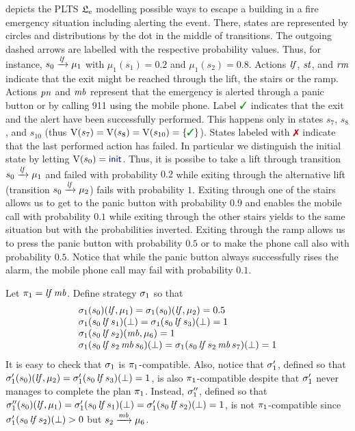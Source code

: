 \begin{example}[Running]\label{ex:running}
   depicts the PLTS $\mathfrak{L}_{\mathrm{e}}$ modelling
  possible ways to escape a building in a fire emergency situation
  including alerting the event.  There, states are represented by
  circles and distributions by the dot in the middle of transitions.
  The outgoing dashed arrows are labelled with the respective
  probability values.  Thus, for instance, $s_0\xrightarrow{\mathit{lf}}\mu_1$
  with $\mu_1(s_1)=0.2$ and $\mu_1(s_2)=0.8$.
  Actions $\mathit{lf}$, $\mathit{st}$, and $\mathit{rm}$ indicate that the exit might
  be reached through the lift, the stairs or the ramp.  Actions
  $\mathit{pn}$ and $\mathit{mb}$ represent that the emergency is alerted
  through a panic button or by calling 911 using the mobile phone.
  Label $\goal$ indicates that the exit and the alert have been
  successfully performed.  This happens only in states $s_7$, $s_8$,
  and $s_{10}$ (thus $\V(s_7)=\V(s_8)=\V(s_{10})=\{\goal\}$).  States
  labeled with $\fail$ indicate that the last performed action has
  failed.  In particular we distinguish the initial state by letting
  $\V(s_0)=\init$.
  Thus, it is possibe to take a lift through transition
  $s_0\xrightarrow{\mathit{lf}}\mu_1$ and failed with probability $0.2$ while
  exiting through the alternative lift (transition
  $s_0\xrightarrow{\mathit{lf}}\mu_2$) fails with probability $1$.
  Exiting through one of the stairs allows us to get to the panic
  button with probability $0.9$ and enables the mobile call with
  probability $0.1$ while exiting through the other stairs yields to
  the same situation but with the probabilities inverted.  Exiting
  through the ramp allows us to press the panic button with
  probability $0.5$ or to make the phone call also with probability
  $0.5$.
  Notice that while the panic button always successfully rises the
  alarm, the mobile phone call may fail with probability $0.1$.

  Let $\pi_1 = \mathit{lf}\,\mathit{mb}$.  Define strategy $\sigma_1$ so that
  \[
  \begin{array}{l}
    \sigma_1(s_0)(\mathit{lf},\mu_1)=\sigma_1(s_0)(\mathit{lf},\mu_2)=0.5\\
    \sigma_1(s_0\,\mathit{lf}\,s_1)(\bot)=\sigma_1(s_0\,\mathit{lf}\,s_3)(\bot)=1\\
    \sigma_1(s_0\,\mathit{lf}\,s_2)(\mathit{mb},\mu_6)=1\\
    \sigma_1(s_0\,\mathit{lf}\,s_2\,\mathit{mb}\,s_6)(\bot)=
    \sigma_1(s_0\,\mathit{lf}\,s_2\,\mathit{mb}\,s_7)(\bot)=1
  \end{array}
  \]
  It is easy to check that $\sigma_1$ is $\pi_1$-compatible.
  Also, notice that $\sigma'_1$, defined so that
  $\sigma'_1(s_0)(\mathit{lf},\mu_2)=\sigma'_1(s_0\,\mathit{lf}\,s_3)(\bot)=1$,
  is also $\pi_1$-compatible despite that $\sigma'_1$ never manages to
  complete the plan $\pi_1$.
  Instead, $\sigma''_1$, defined so that
  $\sigma''_1(s_0)(\mathit{lf},\mu_1)=\sigma'_1(s_0\,\mathit{lf}\,s_1)(\bot)=\sigma'_1(s_0\,\mathit{lf}\,s_2)(\bot)=1$,
  is not $\pi_1$-compatible since
  $\sigma'_1(s_0\,\mathit{lf}\,s_2)(\bot)>0$ but
  ${s_2\xrightarrow{\mathit{mb}}\mu_6}$.
\end{example}


